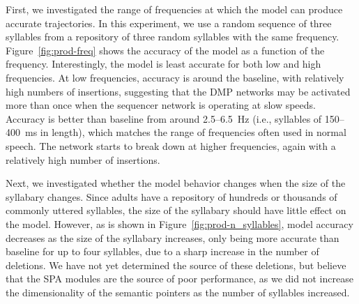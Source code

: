 First, we investigated the
range of frequencies at which the model
can produce accurate trajectories.
In this experiment, we use a random sequence
of three syllables from a
repository of three random syllables
with the same frequency.
Figure~\ref{fig:prod-freq} shows the accuracy
of the model as a function of the frequency.
Interestingly, the model is least accurate
for both low and high frequencies.
At low frequencies, accuracy is around
the baseline, with relatively high
numbers of insertions,
suggesting that the DMP networks
may be activated more than once
when the sequencer network
is operating at slow speeds.
Accuracy is better than baseline
from around 2.5--6.5~Hz
(i.e., syllables of 150--400~ms in length),
which matches the range of frequencies
often used in normal speech.
The network starts to break down
at higher frequencies,
again with a relatively high number
of insertions.


Next, we investigated whether the model
behavior changes when the size
of the syllabary changes.
Since adults have a repository
of hundreds or thousands
of commonly uttered syllables,
the size of the syllabary should have
little effect on the model.
However, as is shown in Figure~\ref{fig:prod-n_syllables},
model accuracy decreases
as the size of the syllabary increases,
only being more accurate than baseline
for up to four syllables,
due to a sharp increase
in the number of deletions.
We have not yet determined the source
of these deletions,
but believe that the SPA modules
are the source of poor performance,
as we did not increase the dimensionality
of the semantic pointers
as the number of syllables increased.


